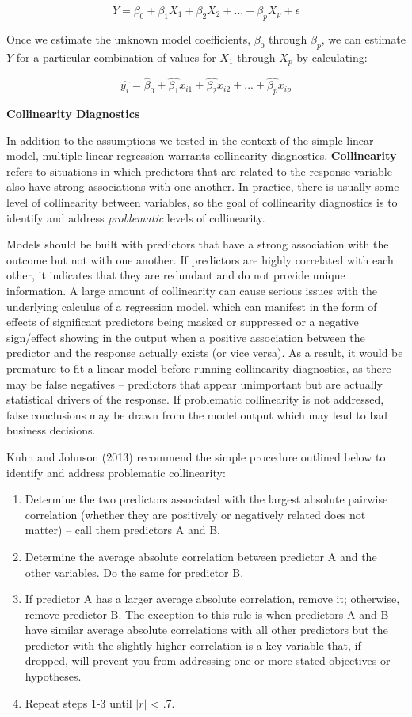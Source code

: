 \documentclass[
]{book}
\providecommand{\tightlist}{%
  \setlength{\itemsep}{0pt}\setlength{\parskip}{0pt}}
\begin{document}
\[ Y = \beta_0 + \beta_1 X_1 + \beta_2 X_2 + {...} + \beta_p X_p + \epsilon \]

Once we estimate the unknown model coefficients, \(\beta_0\) through \(\beta_p\), we can estimate \(Y\) for a particular combination of values for \(X_1\) through \(X_p\) by calculating:

\[ \hat{y_i} = \hat{\beta}_0 + \hat{\beta_1}x_{i1} + \hat{\beta_2}x_{i2} + {...} + \hat{\beta_p} x_{ip} \]

\textbf{Collinearity Diagnostics}

In addition to the assumptions we tested in the context of the simple linear model, multiple linear regression warrants collinearity diagnostics. \textbf{Collinearity} refers to situations in which predictors that are related to the response variable also have strong associations with one another. In practice, there is usually some level of collinearity between variables, so the goal of collinearity diagnostics is to identify and address \emph{problematic} levels of collinearity.

Models should be built with predictors that have a strong association with the outcome but not with one another. If predictors are highly correlated with each other, it indicates that they are redundant and do not provide unique information. A large amount of collinearity can cause serious issues with the underlying calculus of a regression model, which can manifest in the form of effects of significant predictors being masked or suppressed or a negative sign/effect showing in the output when a positive association between the predictor and the response actually exists (or vice versa). As a result, it would be premature to fit a linear model before running collinearity diagnostics, as there may be false negatives -- predictors that appear unimportant but are actually statistical drivers of the response. If problematic collinearity is not addressed, false conclusions may be drawn from the model output which may lead to bad business decisions.

Kuhn and Johnson (2013) recommend the simple procedure outlined below to identify and address problematic collinearity:

\begin{enumerate}
\def\labelenumi{\arabic{enumi}.}
\tightlist
\item
  Determine the two predictors associated with the largest absolute pairwise correlation (whether they are positively or negatively related does not matter) -- call them predictors A and B.
\item
  Determine the average absolute correlation between predictor A and the other variables. Do the same for predictor B.
\item
  If predictor A has a larger average absolute correlation, remove it; otherwise, remove predictor B. The exception to this rule is when predictors A and B have similar average absolute correlations with all other predictors but the predictor with the slightly higher correlation is a key variable that, if dropped, will prevent you from addressing one or more stated objectives or hypotheses.
\item
  Repeat steps 1-3 until \(|r|\) \textless{} .7.
\end{enumerate}
\end{document}
